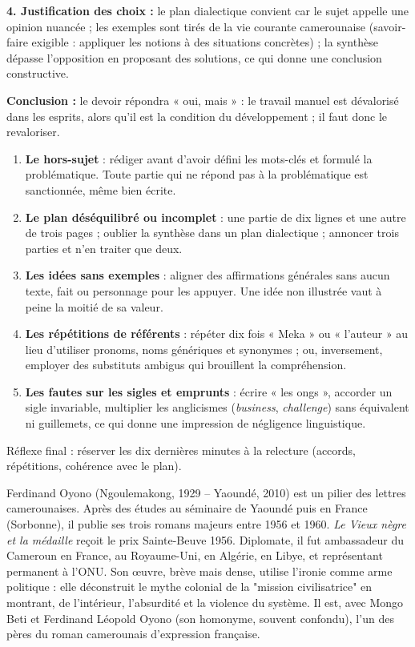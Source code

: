 \documentclass[11pt]{article}
\begin{document}
\begin{exoresolu}
\textbf{4. Justification des choix :} le plan dialectique convient car le sujet appelle une opinion nuancée ; les exemples sont tirés de la vie courante camerounaise (savoir-faire exigible : appliquer les notions à des situations concrètes) ; la synthèse dépasse l'opposition en proposant des solutions, ce qui donne une conclusion constructive.

\textbf{Conclusion :} le devoir répondra « oui, mais » : le travail manuel est dévalorisé dans les esprits, alors qu'il est la condition du développement ; il faut donc le revaloriser.
\end{exoresolu}

\begin{attention}
\begin{enumerate}
\item \textbf{Le hors-sujet} : rédiger avant d'avoir défini les mots-clés et formulé la problématique. Toute partie qui ne répond pas à la problématique est sanctionnée, même bien écrite.
\item \textbf{Le plan déséquilibré ou incomplet} : une partie de dix lignes et une autre de trois pages ; oublier la synthèse dans un plan dialectique ; annoncer trois parties et n'en traiter que deux.
\item \textbf{Les idées sans exemples} : aligner des affirmations générales sans aucun texte, fait ou personnage pour les appuyer. Une idée non illustrée vaut à peine la moitié de sa valeur.
\item \textbf{Les répétitions de référents} : répéter dix fois « Meka » ou « l'auteur » au lieu d'utiliser pronoms, noms génériques et synonymes ; ou, inversement, employer des substituts ambigus qui brouillent la compréhension.
\item \textbf{Les fautes sur les sigles et emprunts} : écrire « les ongs », accorder un sigle invariable, multiplier les anglicismes (\emph{business}, \emph{challenge}) sans équivalent ni guillemets, ce qui donne une impression de négligence linguistique.
\end{enumerate}
Réflexe final : réserver les dix dernières minutes à la relecture (accords, répétitions, cohérence avec le plan).
\end{attention}

\begin{savaistu}
Ferdinand Oyono (Ngoulemakong, 1929 -- Yaoundé, 2010) est un pilier des lettres camerounaises. Après des études au séminaire de Yaoundé puis en France (Sorbonne), il publie ses trois romans majeurs entre 1956 et 1960. \emph{Le Vieux nègre et la médaille} reçoit le prix Sainte-Beuve 1956. Diplomate, il fut ambassadeur du Cameroun en France, au Royaume-Uni, en Algérie, en Libye, et représentant permanent à l'ONU. Son œuvre, brève mais dense, utilise l'ironie comme arme politique : elle déconstruit le mythe colonial de la "mission civilisatrice" en montrant, de l'intérieur, l'absurdité et la violence du système. Il est, avec Mongo Beti et Ferdinand Léopold Oyono (son homonyme, souvent confondu), l'un des pères du roman camerounais d'expression française.
\end{savaistu}
\end{document}
